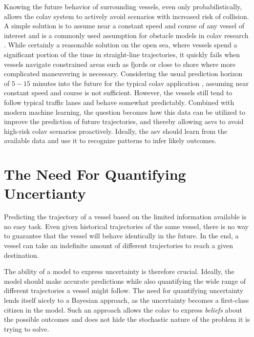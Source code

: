 Knowing the future behavior of surrounding vessels, even only probabilistically, allows the \acrshort{colav} system to actively avoid scenarios with increased risk of collision. A simple solution is to assume near a constant speed and course of any vessel of interest and is a commonly used assumption for obstacle models in \acrshort{colav} research \cite{kuwata, }. While certainly a reasonable solution on the open sea, where vessels spend a significant portion of the time in straight-line trajectories, it quickly fails when vessels navigate constrained areas such as fjords or close to shore where more complicated maneuvering is necessary. Considering the usual prediction horizon of $5-15$ minutes into the future for the typical \acrshort{colav} application \cite{dalsnes}, assuming near constant speed and course is not sufficient. 
However, the vessels still tend to follow typical traffic lanes and behave somewhat predictably. Combined with modern machine learning, the question becomes how this data can be utilized to improve the prediction of future trajectories, and thereby allowing \acrshort{asv}s to avoid high-risk \acrshort{colav} scenarios proactively. Ideally, the \acrshort{asv} should learn from the available data and use it to recognize patterns to infer likely outcomes.

\section{The Need For Quantifying Uncertianty}
Predicting the trajectory of a vessel based on the limited information available is no easy task. Even given historical trajectories of the same vessel, there is no way to guarantee that the vessel will behave identically in the future. In the end, a vessel can take an indefinite amount of different trajectories to reach a given destination. 

The ability of a model to express uncertainty is therefore crucial. Ideally, the model should make accurate predictions while also quantifying the wide range of different trajectories a vessel might follow. The need for quantifying uncertainty lends itself nicely to a Bayesian approach, as the uncertainty becomes a first-class citizen in the model. Such an approach allows the \acrshort{colav} to express \textit{beliefs} about the possible outcomes and does not hide the stochastic nature of the problem it is trying to solve. 

